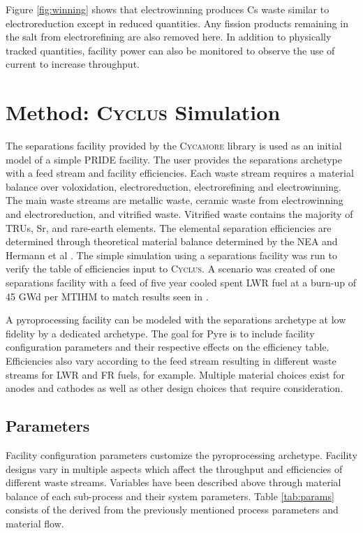 \documentclass{anstrans}
\newcommand{\Cyclus}{\textsc{Cyclus}\xspace}%
\newcommand{\Cycamore}{\textsc{Cycamore}\xspace}%
\begin{document}
Figure \ref{fig:winning} shows that electrowinning produces Cs waste similar to electroreduction except in reduced quantities. Any fission products remaining in the salt from electrorefining are also removed here. In addition to physically tracked quantities, facility power can also be monitored to observe the use of current to increase throughput. 
\section{Method: \Cyclus Simulation}
The separations facility provided by the \Cycamore library is used as an 
initial model of a simple \gls{PRIDE} facility. 
The user provides the separations archetype with a feed stream and facility efficiencies.  
Each waste stream requires a material balance over voloxidation, electroreduction, electrorefining and electrowinning. The main 
waste streams are metallic waste, ceramic waste from electrowinning and electroreduction, and vitrified waste. Vitrified 
waste contains the majority of TRUs, Sr, and rare-earth elements. The elemental separation efficiencies are 
determined through theoretical material balance determined by the NEA and Hermann et al \cite{flowsheet_1998,herrmann_separation_2010}. 
The simple simulation using a separations facility was run to verify the table of efficiencies input to \Cyclus. A scenario was 
created of one separations facility with a feed of five year cooled spent LWR 
fuel at a burn-up of 45 \gls{GWd} per \gls{MTIHM} to 
match results seen in \cite{flowsheet_1998}.

A pyroprocessing facility can be modeled with the separations archetype at low fidelity 
by a dedicated archetype. The goal for Pyre is to include facility configuration parameters and 
their respective effects on the efficiency table. Efficiencies also vary according to the feed stream resulting in different 
waste streams for LWR and FR fuels, for example. Multiple material choices exist for anodes and cathodes as well as other 
design choices that require consideration. 

\subsection{Parameters}
Facility configuration parameters customize the pyroprocessing archetype. Facility designs vary in 
multiple aspects which affect the throughput and efficiencies of different waste streams. Variables have been described above through material balance of each sub-process and their system parameters. Table \ref{tab:params} consists of the  derived from the previously mentioned process parameters and material flow. 
\end{document}
